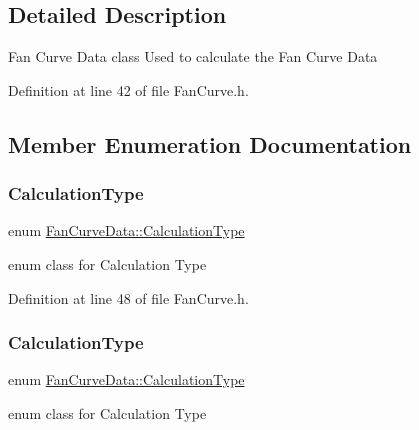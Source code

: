 \subsection{Detailed Description}
Fan Curve Data class Used to calculate the Fan Curve Data 

Definition at line 42 of file Fan\+Curve.\+h.



\subsection{Member Enumeration Documentation}
\mbox{\label{class_fan_curve_data_af87fafad0a2a00e26ba82fb33b1a7282}} 
\subsubsection{\texorpdfstring{Calculation\+Type}{CalculationType}\hspace{0.1cm}{\footnotesize\ttfamily [1/3]}}
{\footnotesize\ttfamily enum \hyperlink{class_fan_curve_data_af87fafad0a2a00e26ba82fb33b1a7282}{Fan\+Curve\+Data\+::\+Calculation\+Type}\hspace{0.3cm}{\ttfamily [strong]}}

enum class for Calculation Type 

Definition at line 48 of file Fan\+Curve.\+h.

\mbox{\label{class_fan_curve_data_af87fafad0a2a00e26ba82fb33b1a7282}} 
\subsubsection{\texorpdfstring{Calculation\+Type}{CalculationType}\hspace{0.1cm}{\footnotesize\ttfamily [2/3]}}
{\footnotesize\ttfamily enum \hyperlink{class_fan_curve_data_af87fafad0a2a00e26ba82fb33b1a7282}{Fan\+Curve\+Data\+::\+Calculation\+Type}\hspace{0.3cm}{\ttfamily [strong]}}

enum class for Calculation Type 

